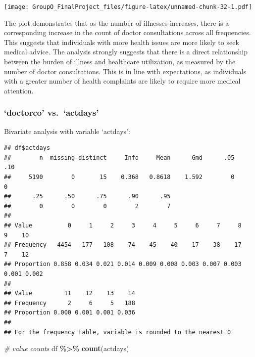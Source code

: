 \documentclass[
]{article}
\newenvironment{Shaded}{\begin{snugshade}}{\end{snugshade}}
\newcommand{\CommentTok}[1]{\textcolor[rgb]{0.56,0.35,0.01}{\textit{#1}}}
\newcommand{\FunctionTok}[1]{\textcolor[rgb]{0.13,0.29,0.53}{\textbf{#1}}}
\newcommand{\NormalTok}[1]{#1}
\newcommand{\SpecialCharTok}[1]{\textcolor[rgb]{0.81,0.36,0.00}{\textbf{#1}}}
\begin{document}
\texttt{[image: GroupO\_FinalProject\_files/figure-latex/unnamed-chunk-32-1.pdf]}

The plot demonstrates that as the number of illnesses increases, there
is a corresponding increase in the count of doctor consultations across
all frequencies. This suggests that individuals with more health issues
are more likely to seek medical advice. The analysis strongly suggests
that there is a direct relationship between the burden of illness and
healthcare utilization, as measured by the number of doctor
consultations. This is in line with expectations, as individuals with a
greater number of health complaints are likely to require more medical
attention.

\subsubsection{`doctorco' vs.~`actdays'}\label{doctorco-vs.-actdays}

Bivariate analysis with variable `actdays':

\begin{Shaded}
\end{Shaded}

\begin{verbatim}
## df$actdays 
##        n  missing distinct     Info     Mean      Gmd      .05      .10 
##     5190        0       15    0.368   0.8618    1.592        0        0 
##      .25      .50      .75      .90      .95 
##        0        0        0        2        7 
##                                                                             
## Value          0     1     2     3     4     5     6     7     8     9    10
## Frequency   4454   177   108    74    45    40    17    38    17     7    12
## Proportion 0.858 0.034 0.021 0.014 0.009 0.008 0.003 0.007 0.003 0.001 0.002
##                                   
## Value         11    12    13    14
## Frequency      2     6     5   188
## Proportion 0.000 0.001 0.001 0.036
## 
## For the frequency table, variable is rounded to the nearest 0
\end{verbatim}

\begin{Shaded}
\begin{Highlighting}[]
\CommentTok{\# value counts}
\NormalTok{df }\SpecialCharTok{\%\textgreater{}\%} \FunctionTok{count}\NormalTok{(actdays)}
\end{Highlighting}
\end{Shaded}
\end{document}
